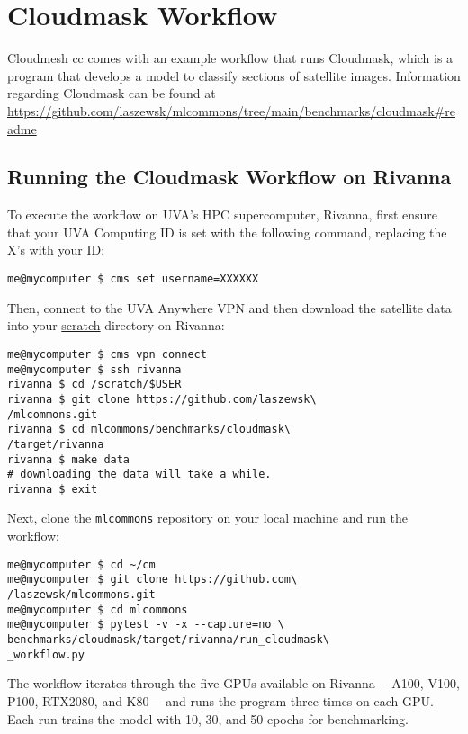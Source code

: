 \section{Cloudmask Workflow}\label{cloudmask-workflow}

Cloudmesh cc comes with an example workflow that runs Cloudmask, which
is a program that develops a model to classify sections of satellite
images. Information regarding Cloudmask can be found at
\url{https://github.com/laszewsk/mlcommons/tree/main/benchmarks/cloudmask\#readme}

\subsection{Running the Cloudmask Workflow on
Rivanna}\label{running-the-cloudmask-workflow-on-rivanna}

To execute the workflow on UVA's HPC supercomputer, Rivanna, first
ensure that your UVA Computing ID is set with the following command,
replacing the X's with your ID:

\begin{verbatim}
me@mycomputer $ cms set username=XXXXXX
\end{verbatim}

Then, connect to the UVA Anywhere VPN and then download the satellite
data into your
\href{https://www.rc.virginia.edu/userinfo/storage/non-sensitive-data/\#scratch}{scratch}
directory on Rivanna:

\begin{verbatim}
me@mycomputer $ cms vpn connect
me@mycomputer $ ssh rivanna
rivanna $ cd /scratch/$USER
rivanna $ git clone https://github.com/laszewsk\
/mlcommons.git
rivanna $ cd mlcommons/benchmarks/cloudmask\
/target/rivanna
rivanna $ make data
# downloading the data will take a while.
rivanna $ exit
\end{verbatim}

Next, clone the \texttt{mlcommons} repository on your local machine and
run the workflow:

\begin{verbatim}
me@mycomputer $ cd ~/cm
me@mycomputer $ git clone https://github.com\
/laszewsk/mlcommons.git
me@mycomputer $ cd mlcommons
me@mycomputer $ pytest -v -x --capture=no \ 
benchmarks/cloudmask/target/rivanna/run_cloudmask\
_workflow.py
\end{verbatim}

The workflow iterates through the five GPUs available on Rivanna---
A100, V100, P100, RTX2080, and K80--- and runs the program three times
on each GPU. Each run trains the model with 10, 30, and 50 epochs for
benchmarking.

